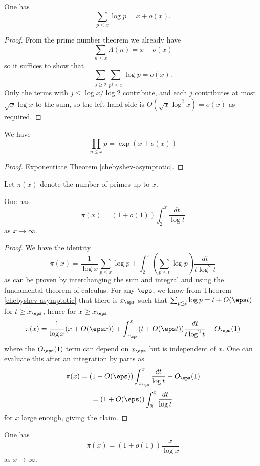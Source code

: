 \begin{theorem}\label{chebyshev-asymptotic}  One has
  $$ \sum_{p \leq x} \log p = x + o(x).$$
\end{theorem}

\begin{proof}
From the prime number theorem we already have
$$ \sum_{n \leq x} \Lambda(n) = x + o(x)$$
so it suffices to show that
$$ \sum_{j \geq 2} \sum_{p^j \leq x} \log p = o(x).$$
Only the terms with $j \leq \log x / \log 2$ contribute, and each $j$ contributes at most $\sqrt{x} \log x$ to the sum, so the left-hand side is $O( \sqrt{x} \log^2 x ) = o(x)$ as required.
\end{proof}

\begin{corollary}  We have
  $$ \prod_{p \leq x} p = \exp( x + o(x) )$$
\end{corollary}

\begin{proof}
  Exponentiate Theorem \ref{chebyshev-asymptotic}.
\end{proof}

Let $\pi(x)$ denote the number of primes up to $x$.

\begin{theorem}\label{pi-asymp}  One has
  $$ \pi(x) = (1+o(1)) \int_2^x \frac{dt}{\log t}$$
as $x \to \infty$.
\end{theorem}

\begin{proof}  We have the identity
$$ \pi(x) = \frac{1}{\log x} \sum_{p \leq x} \log p
+ \int_2^x (\sum_{p \leq t} \log p) \frac{dt}{t \log^2 t}$$
as can be proven by interchanging the sum and integral and using the fundamental theorem of calculus.  For any $\eps$, we know from Theorem \ref{chebyshev-asymptotic} that there is $x_\eps$ such that
$\sum_{p \leq t} \log p = t + O(\eps t)$ for $t \geq x_\eps$, hence for $x \geq x_\eps$
$$ \pi(x) = \frac{1}{\log x} (x + O(\eps x))
+ \int_{x_\eps}^x (t + O(\eps t)) \frac{dt}{t \log^2 t} + O_\eps(1)$$
where the $O_\eps(1)$ term can depend on $x_\eps$ but is independent of $x$.  One can evaluate this after an integration by parts as
$$ \pi(x) = (1+O(\eps)) \int_{x_\eps}^x \frac{dt}{\log t} + O_\eps(1)$$
$$  = (1+O(\eps)) \int_{2}^x \frac{dt}{\log t} $$
for $x$ large enough, giving the claim.
\end{proof}

\begin{corollary}\label{pi-alt}  One has
$$ \pi(x) = (1+o(1)) \frac{x}{\log x}$$
as $x \to \infty$.
\end{corollary}

